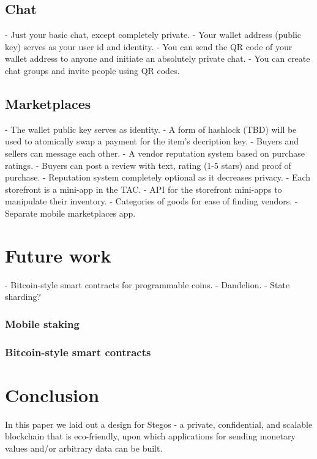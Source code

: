 \documentclass[8pt,fleqn,openany]{book}
\begin{document}
\subsection{Chat}\label{Chat}

- Just your basic chat, except completely private. 
- Your wallet address (public key) serves as your user id and identity. 
- You can send the QR code of your wallet address to anyone and initiate an absolutely private chat.
- You can create chat groups and invite people using QR codes.

\subsection{Marketplaces}\label{Marketplaces}

- The wallet public key serves as identity. 
- A form of hashlock (TBD) will be used to atomically swap a payment for the item's decription key.
- Buyers and sellers can message each other.
- A vendor reputation system based on purchase ratings.
- Buyers can post a review with text, rating (1-5 stars) and proof of purchase. 
- Reputation system completely optional as it decreases privacy.
- Each storefront is a mini-app in the TAC.
- API for the storefront mini-apps to manipulate their inventory.
- Categories of goods for ease of finding vendors.
- Separate mobile marketplaces app.

\section{Future work}\label{FutureWork}

- Bitcoin-style smart contracts for programmable coins.
- Dandelion.
- State sharding?

\subsubsection{Mobile staking}\label{MobileStaking}

\subsubsection{Bitcoin-style smart contracts}\label{SmartContracts}

\section{Conclusion}
In this paper we laid out a design for Stegos - a private, confidential, and scalable blockchain that is eco-friendly, upon which applications for sending monetary values and/or arbitrary data can be built.
\end{document}
